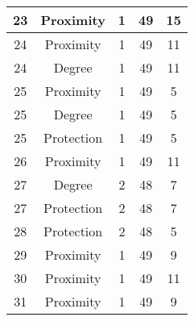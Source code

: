 \documentclass[results.tex]{subfiles}
\begin{document}
\begin{center}
\begin{tabular}{| c || c | c | c | c |}
            \hline
            23                      & Proximity                    & 1                      & 49                      & 15                   \\
            \hline
            24                      & Proximity                    & 1                      & 49                      & 11                   \\
            \hline
            24                      & Degree                       & 1                      & 49                      & 11                   \\
            \hline
            25                      & Proximity                    & 1                      & 49                      & 5                    \\
            \hline
            25                      & Degree                       & 1                      & 49                      & 5                    \\
            \hline
            25                      & Protection                   & 1                      & 49                      & 5                    \\
            \hline
            26                      & Proximity                    & 1                      & 49                      & 11                   \\
            \hline
            27                      & Degree                       & 2                      & 48                      & 7                    \\
            \hline
            27                      & Protection                   & 2                      & 48                      & 7                    \\
            \hline
            28                      & Protection                   & 2                      & 48                      & 5                    \\
            \hline
            29                      & Proximity                    & 1                      & 49                      & 9                    \\
            \hline
            30                      & Proximity                    & 1                      & 49                      & 11                   \\
            \hline
            31                      & Proximity                    & 1                      & 49                      & 9                    \\

\end{tabular}
\end{center}
\end{document}
